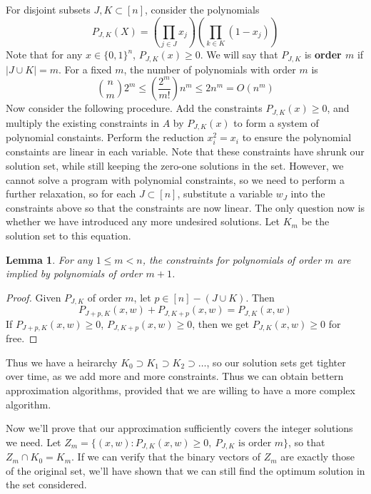 \documentclass{article}
\theoremstyle{plain}
\newtheorem{lemma}[theorem]{Lemma}
\theoremstyle{definition}
\begin{document}
For disjoint subsets $J, K \subset [n]$, consider the polynomials
%
\[ P_{J,K}(X) = \left( \prod_{j \in J} x_j \right) \left( \prod_{k \in K} (1 - x_j) \right) \]
%
Note that for any $x \in \{ 0,1 \}^n$, $P_{J,K}(x) \geq 0$. We will say that $P_{J,K}$ is {\bf order $m$} if $|J \cup K| = m$. For a fixed $m$, the number of polynomials with order $m$ is
%
\[ {n \choose m} 2^m \leq \left( \frac{2^m}{m!} \right) n^m \leq 2n^m = O(n^m) \]
%
Now consider the following procedure. Add the constraints $P_{J,K}(x) \geq 0$, and multiply the existing constraints in $A$ by $P_{J,K}(x)$ to form a system of polynomial constaints. Perform the reduction $x_i^2 = x_i$ to ensure the polynomial constaints are linear in each variable. Note that these constraints have shrunk our solution set, while still keeping the zero-one solutions in the set. However, we cannot solve a program with polynomial constraints, so we need to perform a further relaxation, so for each $J \subset [n]$, substitute a variable $w_J$ into the constraints above so that the constraints are now linear. The only question now is whether we have introduced any more undesired solutions. Let $K_m$ be the solution set to this equation.

\begin{lemma}
    For any $1 \leq m < n$, the constraints for polynomials of order $m$ are implied by polynomials of order $m+1$.
\end{lemma}
\begin{proof}
    Given $P_{J,K}$ of order $m$, let $p \in [n] - (J \cup K)$. Then
    \[ P_{J + p,K}(x,w) + P_{J,K + p}(x,w) = P_{J,K}(x,w) \]
    If $P_{J+p,K}(x,w) \geq 0$, $P_{J,K+p}(x,w) \geq 0$, then we get $P_{J,K}(x,w) \geq 0$ for free.
\end{proof}

Thus we have a heirarchy $K_0 \supset K_1 \supset K_2 \supset \dots$, so our solution sets get tighter over time, as we add more and more constraints. Thus we can obtain bettern approximation algorithms, provided that we are willing to have a more complex algorithm.

Now we'll prove that our approximation sufficiently covers the integer solutions we need. Let $Z_m = \{ (x,w) : P_{J,K}(x,w) \geq 0,\ \text{$P_{J,K}$ is order $m$} \}$, so that $Z_m \cap K_0 = K_m$. If we can verify that the binary vectors of $Z_m$ are exactly those of the original set, we'll have shown that we can still find the optimum solution in the set considered.
\end{document}
